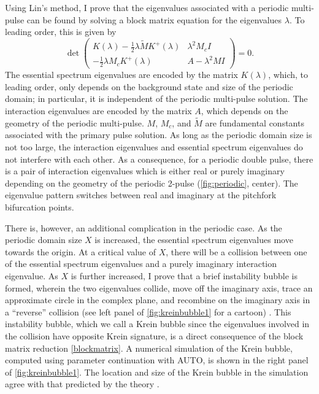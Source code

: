 \documentclass[12pt,reqno,oneside,hidelinks]{article}
\begin{document}
Using Lin's method, I prove that the eigenvalues associated with a periodic multi-pulse can be found by solving a block matrix equation \cite[Theorem 5.3]{ParkerKdV} for the eigenvalues $\lambda$. To leading order, this is given by
    \begin{equation}\label{blockmatrix}
    \det \begin{pmatrix}
    K(\lambda) - \frac{1}{2} \lambda \tilde{M} K^+(\lambda) & \lambda^2 M_c I \\
    -\frac{1}{2} \lambda M_c K^+(\lambda) & A - \lambda^2 MI  
    \end{pmatrix} = 0.
    \end{equation}
The essential spectrum eigenvalues are encoded by the matrix $K(\lambda)$, which, to leading order, only depends on the background state and size of the periodic domain; in particular, it is independent of the periodic multi-pulse solution. The interaction eigenvalues are encoded by the matrix $A$, which depends on the geometry of the periodic multi-pulse. $M$, $M_c$, and $\tilde{M}$ are fundamental constants associated with the primary pulse solution. As long as the periodic domain size is not too large, the interaction eigenvalues and essential spectrum eigenvalues do not interfere with each other. As a consequence, for a periodic double pulse, there is a pair of interaction eigenvalues which is either real or purely imaginary depending on the geometry of the periodic 2-pulse (\cref{fig:periodic}, center). The eigenvalue pattern switches between real and imaginary at the pitchfork bifurcation points.  
    
There is, however, an additional complication in the periodic case. As the periodic domain size $X$ is increased, the essential spectrum eigenvalues move towards the origin. At a critical value of $X$,  there will be a collision between one of the essential spectrum eigenvalues and a purely imaginary interaction eigenvalue. As $X$ is further increased, I prove that a brief instability bubble is formed, wherein the two eigenvalues collide, move off the imaginary axis, trace an approximate circle in the complex plane, and recombine on the imaginary axis in a ``reverse'' collision (see left panel of \cref{fig:kreinbubble1} for a cartoon) \cite{ParkerKdV}. This instability bubble, which we call a Krein bubble since the eigenvalues involved in the collision have opposite Krein signature, is a direct consequence of the block matrix reduction \cref{blockmatrix}. A numerical simulation of the Krein bubble, computed using parameter continuation with AUTO, is shown in the right panel of \cref{fig:kreinbubble1}. The location and size of the Krein bubble in the simulation agree with that predicted by the theory \cite{ParkerKdV}.
    
\end{document}
